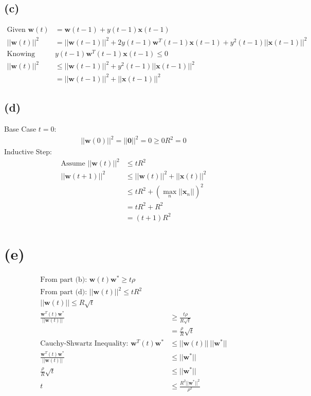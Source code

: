 \documentclass{article}
\begin{document}
	\subsection*{(c)}
		\begin{align*}
			\text{Given } \mathbf w(t) &= \mathbf w(t-1) + y(t-1)\mathbf x(t-1)\\
			||\mathbf w(t)||^2 &= ||\mathbf w(t-1)||^2 + 2y(t-1)\mathbf w^T(t-1)\mathbf x(t-1) + y^2(t-1)||\mathbf x(t-1)||^2\\
			\text{Knowing } &y(t-1)\mathbf w^T(t-1)\mathbf x(t-1) \leq 0\\
			||\mathbf w(t)||^2 &\leq ||\mathbf w(t-1)||^2 + y^2(t-1)||\mathbf x(t-1)||^2\\
			&= ||\mathbf w(t-1)||^2 + ||\mathbf x(t-1)||^2
		\end{align*}
		
	\subsection*{(d)}
		Base Case $t = 0$:
		\begin{align*}
			||\mathbf w(0)||^2 = ||\mathbf 0||^2 = 0 \geq 0R^2 = 0
		\end{align*}
		Inductive Step:
		\begin{align*}
			\text{Assume } ||\mathbf w(t)||^2 &\leq tR^2\\
			||\mathbf w(t+1)||^2 &\leq ||\mathbf w(t)||^2 + ||\mathbf x(t)||^2\\
			&\leq tR^2 + (\max_n ||\mathbf x_n||)^2\\
			&= tR^2 + R^2\\
			&= (t+1)R^2
		\end{align*}
		
	\section*{(e)}
		\begin{align*}
			\text{From part (b): } \mathbf w(t)\mathbf w^* \geq t\rho\\
			\text{From part (d): } ||\mathbf w(t)||^2 \leq tR^2\\
			||\mathbf w(t)|| \leq R\sqrt t\\
			\frac{ \mathbf w^T(t)\mathbf w^* }{||\mathbf w(t)||} &\geq \frac{t\rho}{R\sqrt t}\\
			&= \frac{\rho} R \sqrt t\\
			\text{Cauchy-Shwartz Inequality: }\mathbf w^T(t)\mathbf w^* &\leq ||\mathbf w(t)||\ ||\mathbf w^*||\\
			\frac{\mathbf w^T(t)\mathbf w^* }{ ||\mathbf w(t)||} &\leq ||\mathbf w^*||\\
			\frac{\rho} R \sqrt t &\leq ||\mathbf w^*||\\
			t &\leq \frac{R^2||\mathbf w^*||^2}{\rho^2}
		\end{align*}
		
\end{document}
